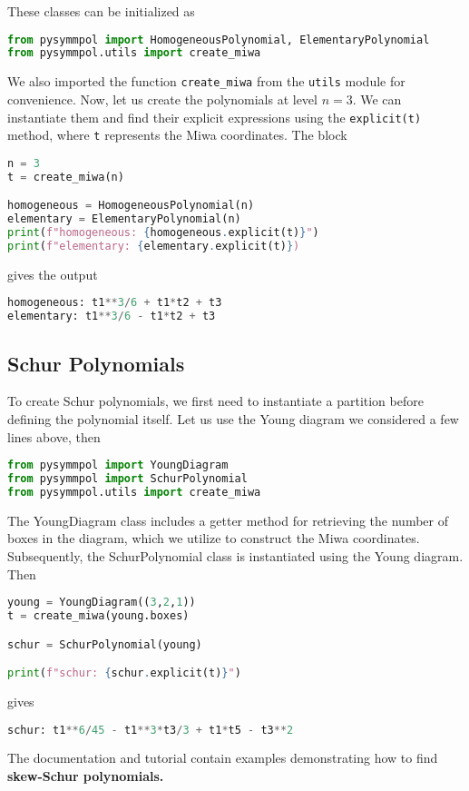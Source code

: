 \documentclass[a4paper,10pt]{amsart}
\begin{document}
These classes can be initialized as 
\begin{lstlisting}[language=Python]
from pysymmpol import HomogeneousPolynomial, ElementaryPolynomial
from pysymmpol.utils import create_miwa
\end{lstlisting}
We also imported the function \verb|create_miwa| from the \verb|utils| module for convenience. 
Now, let us create the polynomials at level $n=3$. We can instantiate 
them and find their explicit expressions using the \verb|explicit(t)| method, where \verb|t| 
represents the Miwa coordinates. The block
\begin{lstlisting}[language=Python]
n = 3
t = create_miwa(n)

homogeneous = HomogeneousPolynomial(n)
elementary = ElementaryPolynomial(n)
print(f"homogeneous: {homogeneous.explicit(t)}")
print(f"elementary: {elementary.explicit(t)})
\end{lstlisting}
gives the output 
\begin{lstlisting}[language=Python]
homogeneous: t1**3/6 + t1*t2 + t3
elementary: t1**3/6 - t1*t2 + t3
\end{lstlisting}



\subsection{Schur Polynomials}

To create Schur polynomials, we first need to instantiate a partition 
before defining the polynomial itself. Let us use the Young diagram we 
considered a few lines above, then
\begin{lstlisting}[language=Python]
from pysymmpol import YoungDiagram
from pysymmpol import SchurPolynomial
from pysymmpol.utils import create_miwa
\end{lstlisting}
The YoungDiagram class includes a getter method for retrieving the number 
of boxes in the diagram, which we utilize to construct the Miwa coordinates. 
Subsequently, the SchurPolynomial class is instantiated using the Young diagram. Then
\begin{lstlisting}[language=Python]
young = YoungDiagram((3,2,1))
t = create_miwa(young.boxes)

schur = SchurPolynomial(young)

print(f"schur: {schur.explicit(t)}")
\end{lstlisting}
gives
\begin{lstlisting}[language=Python]
schur: t1**6/45 - t1**3*t3/3 + t1*t5 - t3**2
\end{lstlisting}
The documentation and tutorial contain examples demonstrating how to find 
\textbf{skew-Schur polynomials.}
\end{document}
